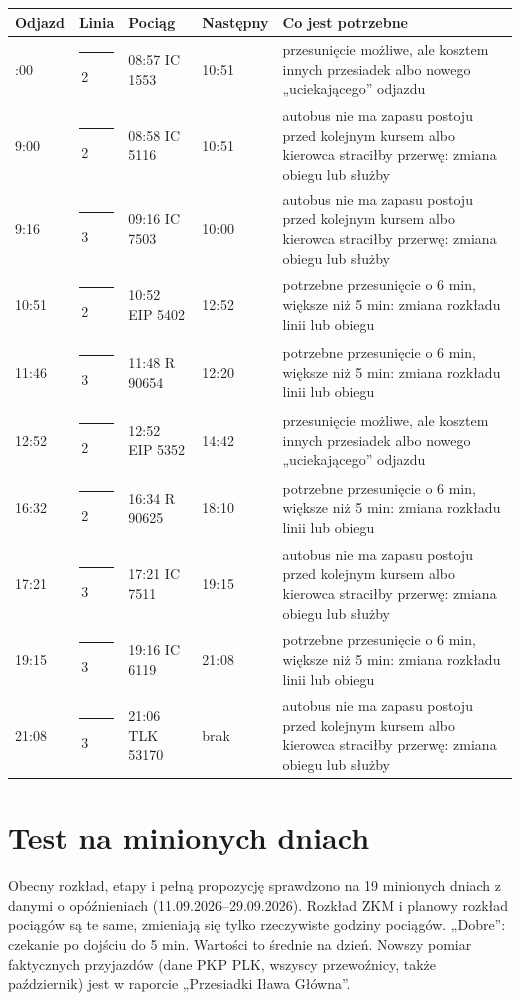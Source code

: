 \documentclass[10pt,a4paper]{article}
\newcommand{\linedot}[1]{\textcolor{#1}{\rule[0.1ex]{0.9ex}{0.9ex}}\,}
\begin{document}
{\footnotesize
\begin{longtable}{@{}l l l l p{6.4cm}@{}}\toprule
Odjazd & Linia & Pociąg & Następny & Co jest potrzebne \\ \midrule\endhead
\bottomrule\endfoot
9:00 & \linedot{L2}2 & 08:57 IC 1553 & 10:51 & przesunięcie możliwe, ale kosztem innych przesiadek albo nowego „uciekającego” odjazdu \\
9:00 & \linedot{L2}2 & 08:58 IC 5116 & 10:51 & autobus nie ma zapasu postoju przed kolejnym kursem albo kierowca straciłby przerwę: zmiana obiegu lub służby \\
9:16 & \linedot{L3}3 & 09:16 IC 7503 & 10:00 & autobus nie ma zapasu postoju przed kolejnym kursem albo kierowca straciłby przerwę: zmiana obiegu lub służby \\
10:51 & \linedot{L2}2 & 10:52 EIP 5402 & 12:52 & potrzebne przesunięcie o 6 min, większe niż 5 min: zmiana rozkładu linii lub obiegu \\
11:46 & \linedot{L3}3 & 11:48 R 90654 & 12:20 & potrzebne przesunięcie o 6 min, większe niż 5 min: zmiana rozkładu linii lub obiegu \\
12:52 & \linedot{L2}2 & 12:52 EIP 5352 & 14:42 & przesunięcie możliwe, ale kosztem innych przesiadek albo nowego „uciekającego” odjazdu \\
16:32 & \linedot{L2}2 & 16:34 R 90625 & 18:10 & potrzebne przesunięcie o 6 min, większe niż 5 min: zmiana rozkładu linii lub obiegu \\
17:21 & \linedot{L3}3 & 17:21 IC 7511 & 19:15 & autobus nie ma zapasu postoju przed kolejnym kursem albo kierowca straciłby przerwę: zmiana obiegu lub służby \\
19:15 & \linedot{L3}3 & 19:16 IC 6119 & 21:08 & potrzebne przesunięcie o 6 min, większe niż 5 min: zmiana rozkładu linii lub obiegu \\
21:08 & \linedot{L3}3 & 21:06 TLK 53170 & brak & autobus nie ma zapasu postoju przed kolejnym kursem albo kierowca straciłby przerwę: zmiana obiegu lub służby \\
\end{longtable}}
\section{Test na minionych dniach}
Obecny rozkład, etapy i pełną propozycję sprawdzono na 19 minionych dniach z danymi o opóźnieniach (11.09.2026--29.09.2026). Rozkład ZKM i planowy rozkład pociągów są te same, zmieniają się tylko rzeczywiste godziny pociągów. „Dobre”: czekanie po dojściu do 5 min. Wartości to średnie na dzień. Nowszy pomiar faktycznych przyjazdów (dane PKP PLK, wszyscy przewoźnicy, także październik) jest w raporcie „Przesiadki Iława Główna”.
\end{document}
